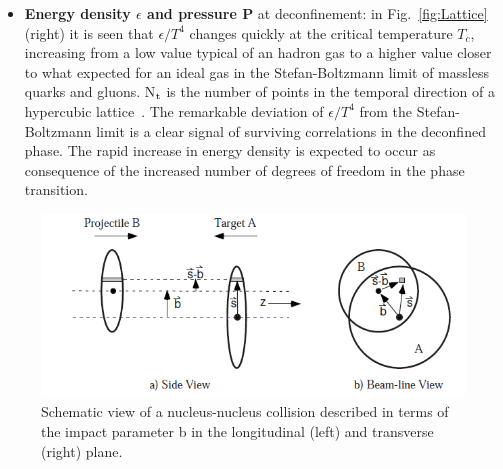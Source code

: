 \begin{itemize}
\item \textbf{Energy density $\epsilon$ and pressure P} at deconfinement: 
in Fig.~\ref{fig:Lattice} (right) it 
is seen that $\epsilon/T^4$ changes quickly at the critical temperature 
$T_c$, increasing from a low 
value typical of an hadron gas to a higher value closer to what expected 
for an ideal gas in the Stefan-Boltzmann limit of 
massless quarks and gluons. N$_{\rm t}$ is the number of points in the temporal
direction of a hypercubic lattice~\cite{Borsanyi:2010cj}. The 
remarkable deviation of $\epsilon/T^4$ from the
Stefan-Boltzmann limit is a clear signal of surviving
correlations in the deconfined phase.
The rapid increase in energy density is expected to occur as consequence of the increased number of degrees of 
freedom in the phase transition. %

\end{itemize}


\begin{figure}[!b]
  \centering
  \includegraphics[width=12cm]{FigCap1/glauber.png}
  \caption{Schematic view of a nucleus-nucleus collision described in terms of the impact parameter b in the longitudinal (left) and transverse (right) plane.}
  \label{fig:image10}
\end{figure}

